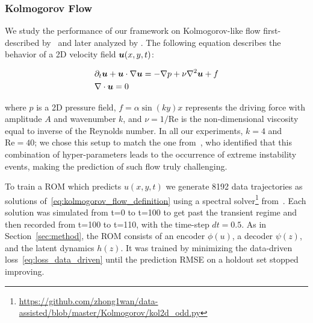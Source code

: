  


\subsubsection{Kolmogorov Flow}
We study the performance of our framework on Kolmogorov-like flow first-described by~\cite{dovzhenko1981generation} and later analyzed by \cite{tithof2017bifurcations,suri2017forecasting}. The following equation describes the behavior of a 2D velocity field $\boldsymbol{u}(x, y, t)$:


\begin{align}
\label{eq:kolmogorov_flow_definition}
	& \partial_t \boldsymbol{u} + \boldsymbol{u} \cdot \nabla \boldsymbol{u} = -\nabla p + \nu\nabla^2\boldsymbol{u} + f \\
	& \nabla \cdot \boldsymbol{u} = 0
\end{align}

where $p$ is a 2D pressure field, $f = \alpha\sin(ky)x$ represents the driving force with amplitude $A$ and wavenumber $k$, and $\nu = 1/\text{Re}$ is the non-dimensional viscosity equal to inverse of the Reynolds number. In all our experiments, $k = 4$ and $\text{Re} = 40$; we chose this setup to match the one from~\cite{wan2018data}, who identified that this combination of hyper-parameters leads to the occurrence of extreme instability events, making the prediction of such flow truly challenging. 

To train a ROM which predicts $u(x, y, t)$ we generate 8192 data trajectories as solutions of~\eqref{eq:kolmogorov_flow_definition} using a spectral solver\footnote{\href{https://github.com/zhong1wan/data-assisted/blob/master/Kolmogorov/kol2d_odd.py}{https://github.com/zhong1wan/data-assisted/blob/master/Kolmogorov/kol2d\_odd.py}} from~\cite{wan2018data}. Each solution was simulated from t=0 to t=100 to get past the transient regime and then recorded from t=100 to t=110, with the time-step $dt=0.5$. As in Section~\ref{sec:method}, the ROM consists of an encoder $\phi(u)$, a decoder $\psi(z)$, and the latent dynamics $h(z)$. It was trained by minimizing the data-driven loss~\eqref{eq:loss_data_driven} until the prediction RMSE on a holdout set stopped improving. 

